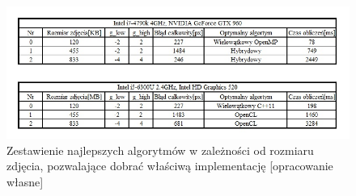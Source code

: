 \documentclass[document.tex]{subfiles}
\begin{document}
\begin{figure}[h]
\includegraphics[scale=0.75]{imgs/results_best.jpg}
\caption{Zestawienie najlepszych algorytmów w zależności od rozmiaru zdjęcia, pozwalające dobrać
właściwą implementację [opracowanie własne]}
\label{fig:results_best}
\end{figure}
\end{document}
